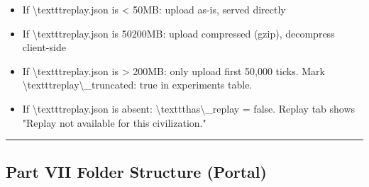 \documentclass[11pt,a4paper]{article}
\begin{document}
\begin{itemize}
  \item If \textbackslash{}texttt{replay.json} is \textless{} 50MB: upload as-is, served directly
  \item If \textbackslash{}texttt{replay.json} is 50200MB: upload compressed (gzip), decompress client-side
  \item If \textbackslash{}texttt{replay.json} is \textgreater{} 200MB: only upload first 50,000 ticks. Mark \textbackslash{}texttt{replay\textbackslash{}\_truncated: true} in experiments table.
  \item If \textbackslash{}texttt{replay.json} is absent: \textbackslash{}texttt{has\textbackslash{}\_replay = false}. Replay tab shows "Replay not available for this civilization."
\end{itemize}

\noindent\rule{\textwidth}{0.4pt}

\subsection*{Part VII  Folder Structure (Portal)}
\end{document}
